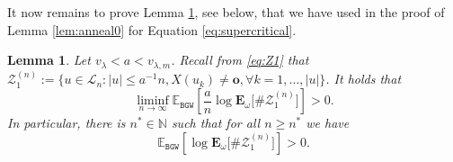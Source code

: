 \documentclass[11 pt]{article}
\newtheorem{lemma}[theorem]{Lemma}
\theoremstyle{definition}
\numberwithin{equation}{section}
\newcommand{\NN}{\mathbb{N}}
\newcommand{\EE}{\mathbb{E}} %
\newcommand{\rt}{\mathbf{o}} %
\newcommand{\Ew}{\mathbf{E}_{\omega}} %
\begin{document}
It now remains to prove Lemma \ref{lem:log}, see below, that we have used in the proof of Lemma \ref{lem:anneal0} for Equation \eqref{eq:supercritical}. 
\begin{lemma}\label{lem:log}
  	Let  $v_{\lambda} < a< v_{\lambda, m}$. 
  		Recall from \eqref{eq:Z1} that $\mathcal{Z}^{(n)}_1:= \{u\in \mathcal{L}_n \colon |u| \le a^{-1} n,X(u_k)\ne \rt, \forall k= 1,\ldots, |u| \} $. 
  	It holds that
	\begin{equation}
	\liminf_{n\to \infty}\EE_{\mathtt{BGW}} \left[\frac{a}{n}\log \Ew\big[\# \mathcal{Z}^{(n)}_1 \big] \right] >0.
	\end{equation}
	In particular, there is $n^* \in \NN$ such that for all $n\geq n^*$ we have
	\begin{equation}\label{eq:lem:log}
	\EE_{\mathtt{BGW}} \left[\log \Ew\big[	\# \mathcal{Z}^{(n)}_1   \big] \right] >0. 
	\end{equation}
\end{lemma}
\end{document}
